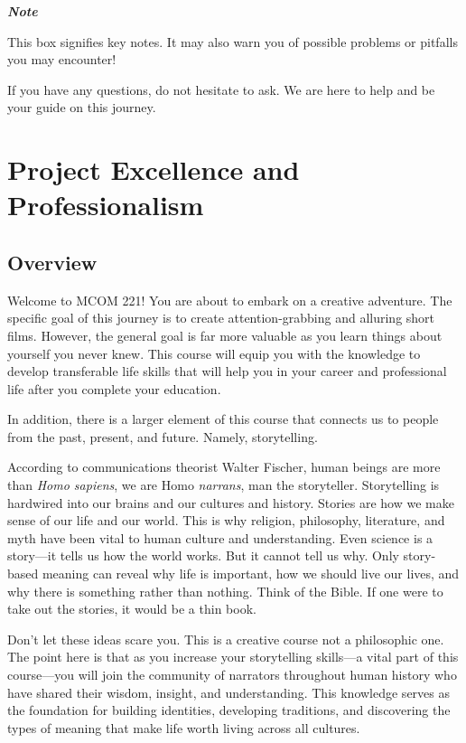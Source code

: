 \documentclass[
]{book}
\begin{document}
\begin{caution}
\textbf{\emph{Note}}

This box signifies key notes. It may also warn you of possible problems or pitfalls you may encounter!
\end{caution}

If you have any questions, do not hesitate to ask. We are here to help and be your guide on this journey.

\hypertarget{project-excellence-and-professionalism}{%
\chapter{Project Excellence and Professionalism}\label{project-excellence-and-professionalism}}

\hypertarget{overview}{%
\section*{Overview}\label{overview}}

Welcome to MCOM 221! You are about to embark on a creative adventure. The specific goal of this journey is to create attention-grabbing and alluring short films. However, the general goal is far more valuable as you learn things about yourself you never knew. This course will equip you with the knowledge to develop transferable life skills that will help you in your career and professional life after you complete your education.

In addition, there is a larger element of this course that connects us to people from the past, present, and future. Namely, storytelling.

According to communications theorist Walter Fischer, human beings are more than \emph{Homo sapiens}, we are Homo \emph{narrans}, man the storyteller. Storytelling is hardwired into our brains and our cultures and history. Stories are how we make sense of our life and our world. This is why religion, philosophy, literature, and myth have been vital to human culture and understanding. Even science is a story---it tells us how the world works. But it cannot tell us why. Only story-based meaning can reveal why life is important, how we should live our lives, and why there is something rather than nothing. Think of the Bible. If one were to take out the stories, it would be a thin book.

Don't let these ideas scare you. This is a creative course not a philosophic one. The point here is that as you increase your storytelling skills---a vital part of this course---you will join the community of narrators throughout human history who have shared their wisdom, insight, and understanding. This knowledge serves as the foundation for building identities, developing traditions, and discovering the types of meaning that make life worth living across all cultures.
\end{document}
